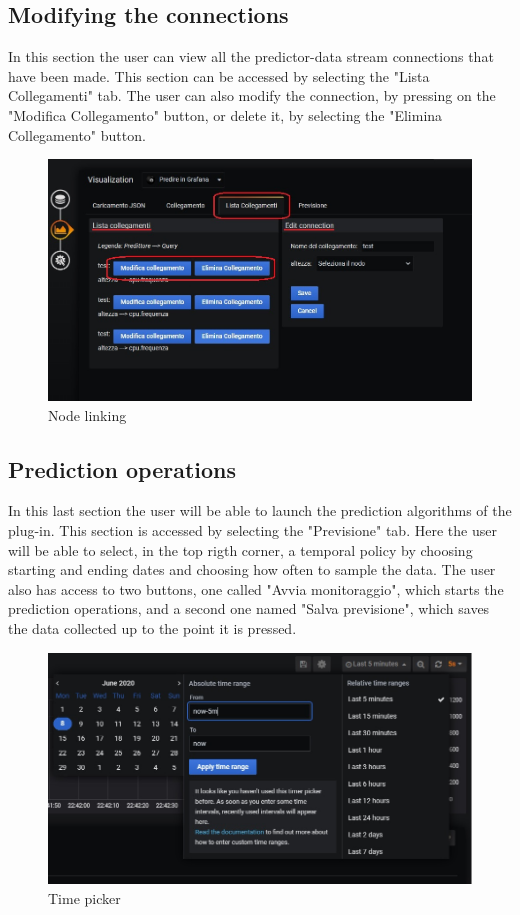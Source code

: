 \subsection{Modifying the connections}
In this section the user can view all the predictor-data stream connections that have been made. This section can be accessed by selecting the "Lista Collegamenti" tab.
The user can also modify the connection, by pressing on the "Modifica Collegamento" button, or delete it, by selecting the "Elimina Collegamento" button.

\begin{figure}[H]
\centering
\includegraphics[scale=0.75]{img/plug-in/collegamento_node.jpg}
\caption{Node linking}
\end{figure}


\subsection{Prediction operations}
In this last section the user will be able to launch the prediction algorithms of the plug-in. This section is accessed by selecting the "Previsione" tab. Here the user will be able to select, in the top rigth corner, a temporal policy by choosing starting and ending dates and choosing how often to sample the data. The user  also has access to two buttons, one called "Avvia monitoraggio", which starts the prediction operations, and a second one named "Salva previsione", which saves the data collected up to the point it is pressed.\\

\begin{figure}[H]
\centering
\includegraphics[scale=0.50]{img/plug-in/time_selector.jpg}
\caption{Time picker}
\end{figure}

